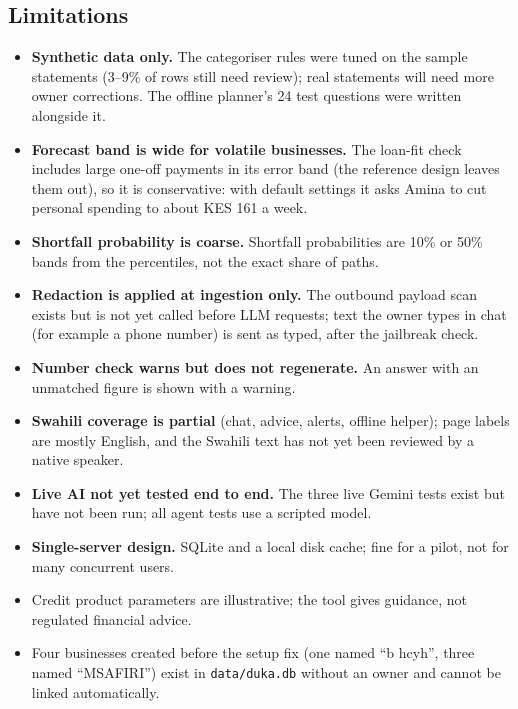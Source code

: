\documentclass[10pt,a4paper]{article}
\newcommand{\code}[1]{\texttt{\small #1}}
\begin{document}
\subsection{Limitations}
\begin{itemize}
  \item \textbf{Synthetic data only.} The categoriser rules were tuned on the sample statements (3--9\% of rows still need review); real statements will need more owner corrections. The offline planner's 24 test questions were written alongside it.
  \item \textbf{Forecast band is wide for volatile businesses.} The loan-fit check includes large one-off payments in its error band (the reference design leaves them out), so it is conservative: with default settings it asks Amina to cut personal spending to about KES 161 a week.
  \item \textbf{Shortfall probability is coarse.} Shortfall probabilities are 10\% or 50\% bands from the percentiles, not the exact share of paths.
  \item \textbf{Redaction is applied at ingestion only.} The outbound payload scan exists but is not yet called before LLM requests; text the owner types in chat (for example a phone number) is sent as typed, after the jailbreak check.
  \item \textbf{Number check warns but does not regenerate.} An answer with an unmatched figure is shown with a warning.
  \item \textbf{Swahili coverage is partial} (chat, advice, alerts, offline helper); page labels are mostly English, and the Swahili text has not yet been reviewed by a native speaker.
  \item \textbf{Live AI not yet tested end to end.} The three live Gemini tests exist but have not been run; all agent tests use a scripted model.
  \item \textbf{Single-server design.} SQLite and a local disk cache; fine for a pilot, not for many concurrent users.
  \item Credit product parameters are illustrative; the tool gives guidance, not regulated financial advice.
  \item Four businesses created before the setup fix (one named ``b hcyh'', three named ``MSAFIRI'') exist in \code{data/duka.db} without an owner and cannot be linked automatically.
\end{itemize}
\end{document}
